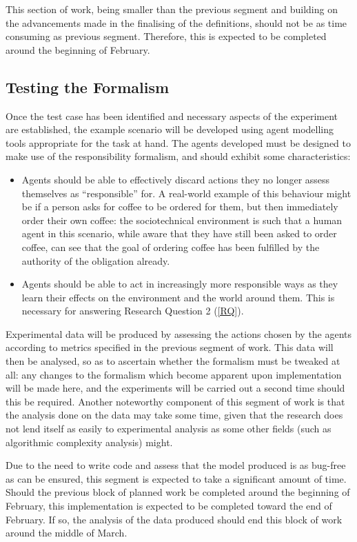 This section of work, being smaller than the previous segment and building on the advancements made in the finalising of the definitions, should not be as time consuming as previous segment. Therefore, this is expected to be completed around the beginning of February.\par

\subsection{Testing the Formalism}
Once the test case has been identified and necessary aspects of the experiment are established, the example scenario will be developed using agent modelling tools appropriate for the task at hand. The agents developed must be designed to make use of the responsibility formalism, and should exhibit some characteristics:
\begin{itemize}
    \item Agents should be able to effectively discard actions they no longer assess themselves as ``responsible'' for. A real-world example of this behaviour might be if a person asks for coffee to be ordered for them, but then immediately order their own coffee: the sociotechnical environment is such that a human agent in this scenario, while aware that they have still been asked to order coffee, can see that the goal of ordering coffee has been fulfilled by the authority of the obligation already.
    \item Agents should be able to act in increasingly more responsible ways as they learn their effects on the environment and the world around them. This is necessary for answering Research Question 2 (\cref{RQ}).
\end{itemize}

Experimental data will be produced by assessing the actions chosen by the agents according to metrics specified in the previous segment of work. This data will then be analysed, so as to ascertain whether the formalism must be tweaked at all: any changes to the formalism which become apparent upon implementation will be made here, and the experiments will be carried out a second time should this be required. Another noteworthy component of this segment of work is that the analysis done on the data may take some time, given that the research does not lend itself as easily to experimental analysis as some other fields (such as algorithmic complexity analysis) might.\par

Due to the need to write code and assess that the model produced is as bug-free as can be ensured, this segment is expected to take a significant amount of time. Should the previous block of planned work be completed around the beginning of February, this implementation is expected to be completed toward the end of February. If so, the analysis of the data produced should end this block of work around the middle of March.\par

